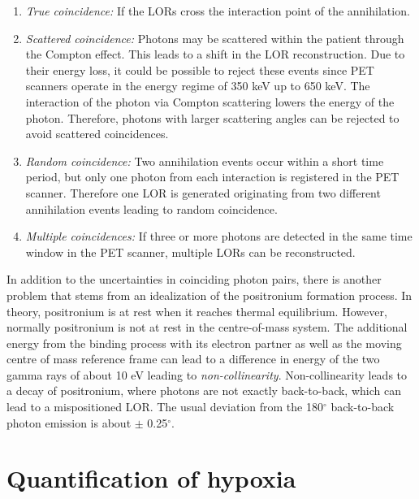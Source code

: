 \begin{enumerate}
\item \textit{True coincidence: }If the LORs cross the interaction point of the annihilation.
\item \textit{Scattered coincidence: }Photons may be scattered within the patient through the Compton effect. This leads to a shift in the LOR reconstruction. Due to their energy loss, it could be possible to reject these events since PET scanners operate in the energy regime of 350 keV up to 650 keV. The interaction of the photon via Compton scattering lowers the energy of the photon. Therefore, photons with larger scattering angles can be rejected to avoid scattered coincidences.\
\item \textit{Random coincidence: }Two annihilation events occur within a short time period, but only one photon from each interaction is registered in the PET scanner. Therefore one LOR is generated originating from two different annihilation events leading to random coincidence. 
\item \textit{Multiple coincidences: }If three or more photons are detected in the same time window in the PET scanner, multiple LORs can be reconstructed.
\end{enumerate}
In addition to the uncertainties in coinciding photon pairs, there is another problem that stems from an idealization of the positronium formation process. In theory, positronium is at rest when it reaches thermal equilibrium. However, normally positronium is not at rest in the centre-of-mass system. The additional energy from the binding process with its electron partner as well as the moving centre of mass reference frame can lead to a difference in energy of the two gamma rays of about 10 eV leading to \textit{non-collinearity}. Non-collinearity leads to a decay of positronium, where photons are not exactly back-to-back, which can lead to a mispositioned LOR. The usual deviation from the 180$^\circ$ back-to-back photon emission is about $\pm$ 0.25$^\circ$\cite{Cherry}.

\section{Quantification of hypoxia}
